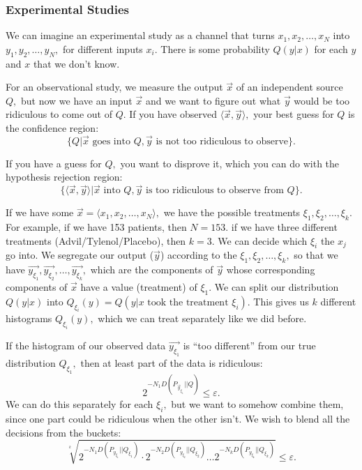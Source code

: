 \documentclass[12pt]{article}
\theoremstyle{remark}
\begin{document}
\subsubsection{Experimental Studies}
We can imagine an experimental study as a channel that turns $x_1,x_2,\dots,x_N$ into $y_1,y_2,\dots,y_N,$ for different inputs $x_i.$ There is some probability $Q(y|x)$ for each $y$ and $x$ that we don't know.

For an observational study, we measure the output $\vec{x}$ of an independent source $Q,$ but now we have an input $\vec{x}$ and we want to figure out what $\vec{y}$ would be too ridiculous to come out of $Q.$ If you have observed $\langle\vec{x},\vec{y}\rangle,$ your best guess for $Q$ is the confidence region:
\[\{Q|\vec{x} \text{ goes into } Q,\vec{y}\text{ is not too ridiculous to observe}\}.\]

If you have a guess for $Q,$ you want to disprove it, which you can do with the hypothesis rejection region:
\[\{\langle\vec{x},\vec{y}\rangle|\vec{x}\text{ into }Q,\vec{y}\text{ is too ridiculous to observe from }Q\}.\]

If we have some $\vec{x}=\langle x_1,x_2,\dots,x_N\rangle,$ we have the possible treatments $\xi_1,\xi_2,\dots,\xi_k.$ For example, if we have 153 patients, then $N=153.$ if we have three different treatments (Advil/Tylenol/Placebo), then $k=3.$ We can decide which $\xi_i$ the $x_j$ go into. We segregate our output ($\vec{y}$) according to the $\xi_1,\xi_2,\dots,\xi_k,$ so that we have $\vec{y_{\xi_1}},\vec{y_{\xi_2}},\dots,\vec{y_{\xi_k}},$ which are the components of $\vec{y}$ whose corresponding components of $\vec{x}$ have a value (treatment) of $\xi_1.$ We can split our distribution $Q(y|x)$ into $Q_{\xi_i}(y)=Q(y|x\text{ took the treatment } \xi_i).$ This gives us $k$ different histograms $Q_{\xi_i}(y),$ which we can treat separately like we did before. 

If the histogram of our observed data $\vec{y_{\xi_1}}$ is ``too different'' from our true distribution $Q_{\xi_1},$ then at least part of the data is ridiculous:
\[2^{-N_1D(P_{\vec{y}_{\xi_1}}||Q)}\le\varepsilon.\] We can do this separately for each $\xi_i,$ but we want to somehow combine them, since one part could be ridiculous when the other isn't. We wish to blend all the decisions from the buckets:
\[\sqrt[^k]{2^{-N_1D(P_{y_{\xi_1}}||Q_{\xi_1})}\cdot2^{-N_2D(P_{y_{\xi_2}}||Q_{\xi_2})}\dots2^{-N_kD(P_{y_{\xi_k}}||Q_{\xi_k})}}\le \varepsilon.\]
\end{document}
